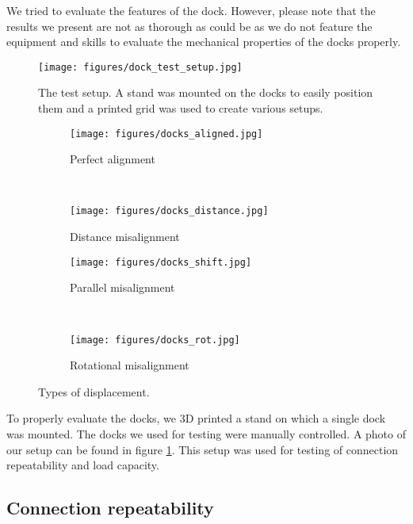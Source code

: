 We tried to evaluate the features of the dock. However, please note that the
results we present are not as thorough as could be as we do not feature the
equipment and skills to evaluate the mechanical properties of the docks
properly.

\begin{figure}[!t]
    \centering
    \texttt{[image: figures/dock\_test\_setup.jpg]}
    \caption{The test setup. A stand was mounted on the docks to easily position
    them and a printed grid was used to create various setups.}
    \label{fig:dock_test_setup}
\end{figure}

\begin{figure}[!t]
    \centering
    \begin{subfigure}[b]{0.45\textwidth}
        \texttt{[image: figures/docks\_aligned.jpg]}
        \caption{Perfect alignment}
        \label{fig:dock_test_aligned}
    \end{subfigure}
    ~
    \begin{subfigure}[b]{0.45\textwidth}
        \texttt{[image: figures/docks\_distance.jpg]}
        \caption{Distance misalignment}
        \label{fig:dock_test_distance}
    \end{subfigure}

    \begin{subfigure}[b]{0.45\textwidth}
        \texttt{[image: figures/docks\_shift.jpg]}
        \caption{Parallel misalignment}
        \label{fig:dock_test_parallel}
    \end{subfigure}
    ~
    \begin{subfigure}[b]{0.45\textwidth}
        \texttt{[image: figures/docks\_rot.jpg]}
        \caption{Rotational misalignment}
        \label{fig:dock_test_rot}
    \end{subfigure}

    \caption{Types of displacement.}
    \label{fig:dock_diplacement}
\end{figure}

To properly evaluate the docks, we 3D printed a stand on which a single dock was
mounted. The docks we used for testing were manually controlled. A photo of our
setup can be found in figure \ref{fig:dock_test_setup}. This setup was used for
testing of connection repeatability and load capacity.

\subsection{Connection repeatability}

